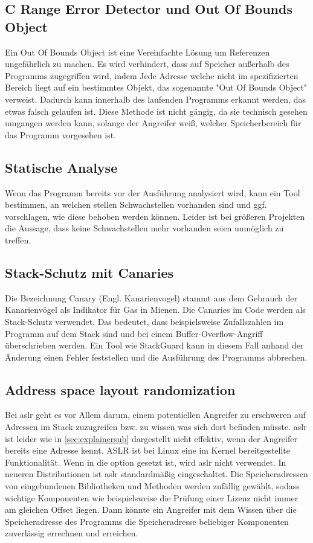 \subsection{C Range Error Detector und Out Of Bounds Object}
Ein Out Of Bounds Object ist eine Vereinfachte Lösung um Referenzen ungefährlich zu machen.
Es wird verhindert, dass auf Speicher außerhalb des Programms zugegriffen wird, indem Jede
Adresse welche nicht im spezifizierten Bereich liegt auf ein bestimmtes Objekt, das sogenannte
"Out Of Bounds Object" verweist. Dadurch kann innerhalb des laufenden Programms erkannt werden, das
etwas falsch gelaufen ist. Diese Methode ist nicht gängig, da sie technisch gesehen
umgangen werden kann, solange der Angreifer weiß, welcher Speicherbereich für das Programm
vorgesehen ist.

\subsection{Statische Analyse}
Wenn das Programm bereits vor der Ausführung analysiert wird, kann ein
Tool bestimmen, an welchen stellen Schwachstellen vorhanden sind und
ggf. vorschlagen, wie diese behoben werden können. Leider ist bei größeren
Projekten die Aussage, dass keine Schwachstellen mehr vorhanden seien
unmöglich zu treffen.

\subsection{Stack-Schutz mit Canaries} \label{sec:canaries}
Die Bezeichnung Canary (Engl. Kanarienvogel) stammt aus dem Gebrauch der Kanarienvögel als
Indikator für Gas in Mienen. Die Canaries im Code werden als Stack-Schutz verwendet. Das bedeutet,
dass beispielsweise Zufallszahlen im Programm auf dem Stack sind und bei einem Buffer-Overflow-Angriff
überschrieben werden. Ein Tool wie StackGuard kann in diesem Fall anhand der Änderung einen Fehler feststellen und
die Ausführung des Programms abbrechen.

\subsection{Address space layout randomization} \label{sec:aslr}
Bei \gls{aslr} geht es vor Allem darum, einem potentiellen Angreifer zu erschweren
auf Adressen im Stack zuzugreifen bzw. zu wissen was sich dort befinden müsste.
\gls{aslr} ist leider wie in \autoref{sec:explainersub} dargestellt nicht effektiv, wenn der Angreifer
bereits eine Adresse kennt.
ASLR ist bei Linux eine im Kernel bereitgestellte Funktionalität.
Wenn in  die option  gesetzt ist,
wird \gls{aslr}  nicht verwendet. \cite{aslrandrew} In neueren Distributionen ist \gls{aslr} 
standardmäßig eingeschaltet.
Die Speicheradressen von eingebundenen Bibliotheken und Methoden werden
zufällig gewählt, sodass wichtige Komponenten wie beispielsweise die
Prüfung einer Lizenz nicht immer am gleichen Offset liegen. Dann könnte ein Angreifer
mit dem Wissen über die Speicheradresse des Programms die Speicheradresse beliebiger
Komponenten zuverlässig errechnen und erreichen.


